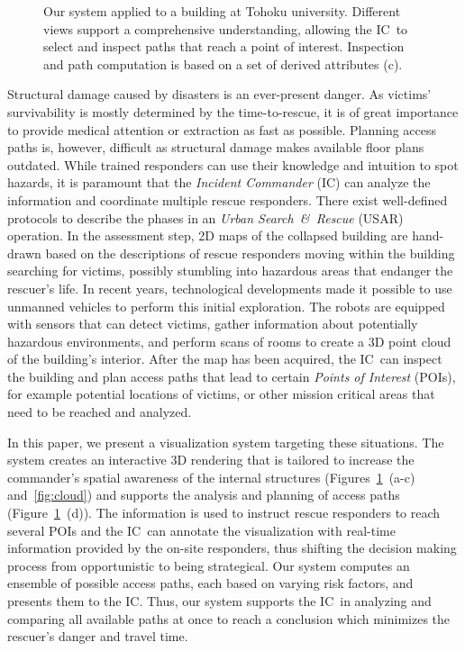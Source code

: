 \documentclass[conference,10pt,letter]{IEEEtran}
\def\IC{IC}
\begin{document}
\begin{figure}
  \caption{Our system applied to a building at Tohoku university. Different views support a comprehensive understanding, allowing the \IC\ to select and inspect paths that reach a point of interest. Inspection and path computation is based on a set of derived attributes (c).}
  \label{fig:teaser}
\end{figure}

Structural damage caused by disasters is an ever-present danger. As victims' survivability is mostly determined by the time-to-rescue, it is of great importance to provide medical attention or extraction as fast as possible. Planning access paths is, however, difficult as structural damage makes available floor plans outdated. While trained responders can use their knowledge and intuition to spot hazards, it is paramount that the \emph{Incident Commander} (IC) can analyze the information and coordinate multiple rescue responders. There exist well-defined protocols to describe the phases in an \emph{Urban Search~\&~Rescue} (USAR) operation. In the assessment step, 2D maps of the collapsed building are hand-drawn based on the descriptions of rescue responders moving within the building searching for victims, possibly stumbling into hazardous areas that endanger the rescuer's life. In recent years, technological developments made it possible to use unmanned vehicles to perform this initial exploration. The robots are equipped with sensors that can detect victims, gather information about potentially hazardous environments, and perform scans of rooms to create a 3D point cloud of the building's interior. After the map has been acquired, the \IC\ can inspect the building and plan access paths that lead to certain \emph{Points of Interest} (POIs), for example potential locations of victims, or other mission critical areas that need to be reached and analyzed.

In this paper, we present a visualization system targeting these situations. The system creates an interactive 3D rendering that is tailored to increase the commander's spatial awareness of the internal structures (Figures~\ref{fig:teaser}~(a-c) and~\ref{fig:cloud}) and supports the analysis and planning of access paths (Figure~\ref{fig:teaser}~(d)). The information is used to instruct rescue responders to reach several POIs and the \IC\ can annotate the visualization with real-time information provided by the on-site responders, thus shifting the decision making process from opportunistic to being strategical. Our system computes an ensemble of possible access paths, each based on varying risk factors, and presents them to the \IC . Thus, our system supports the \IC\ in analyzing and comparing all available paths at once to reach a conclusion which minimizes the rescuer's danger and travel time.
\end{document}
